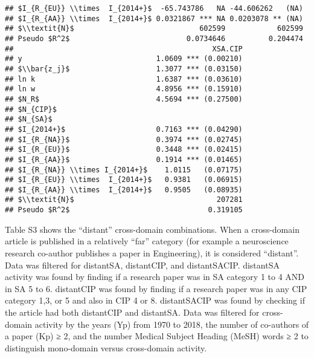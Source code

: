 \documentclass[
]{article}
\begin{document}
\begin{verbatim}
## $I_{R_{EU}} \\times  I_{2014+}$  -65.743786   NA -44.606262   (NA)
## $I_{R_{AA}} \\times  I_{2014+}$ 0.0321867 *** NA 0.0203078 ** (NA)
## $\\textit{N}$                             602599            602599
## Pseudo $R^2$                           0.0734646          0.204474
##                                              XSA.CIP
## y                               1.0609 *** (0.00210)
## $\\bar{z_j}$                    1.3077 *** (0.03150)
## ln k                            1.6387 *** (0.03610)
## ln w                            4.8956 *** (0.15910)
## $N_R$                           4.5694 *** (0.27500)
## $N_{CIP}$                                           
## $N_{SA}$                                            
## $I_{2014+}$                     0.7163 *** (0.04290)
## $I_{R_{NA}}$                    0.3974 *** (0.02745)
## $I_{R_{EU}}$                    0.3448 *** (0.02415)
## $I_{R_{AA}}$                    0.1914 *** (0.01465)
## $I_{R_{NA}} \\times I_{2014+}$    1.0115   (0.07175)
## $I_{R_{EU}} \\times  I_{2014+}$   0.9381   (0.06915)
## $I_{R_{AA}} \\times  I_{2014+}$   0.9505   (0.08935)
## $\\textit{N}$                                 207281
## Pseudo $R^2$                                0.319105
\end{verbatim}

Table S3 shows the ``distant'' cross-domain combinations. When a
cross-domain article is published in a relatively ``far'' category (for
example a neuroscience research co-author publishes a paper in
Engineering), it is considered ``distant''. Data was filtered for
distantSA, distantCIP, and distantSACIP. distantSA activity was found by
finding if a research paper was in SA category 1 to 4 AND in SA 5 to 6.
distantCIP was found by finding if a research paper was in any CIP
category 1,3, or 5 and also in CIP 4 or 8. distantSACIP was found by
checking if the article had both distantCIP and distantSA. Data was
filtered for cross-domain activity by the years (Yp) from 1970 to 2018,
the number of co-authors of a paper (Kp) ≥ 2, and the number Medical
Subject Heading (MeSH) words ≥ 2 to distinguish mono-domain versus
cross-domain activity.
\end{document}
